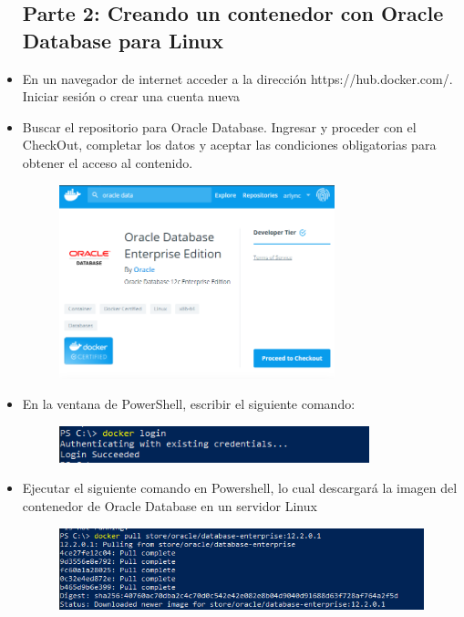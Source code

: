 \begin{itemize}
\subsection{Parte 2: Creando un contenedor con Oracle Database para Linux}
	\item En un navegador de internet acceder a la dirección https://hub.docker.com/. Iniciar sesión o crear una cuenta nueva
	\item Buscar el repositorio para Oracle Database. Ingresar y proceder con el CheckOut, completar los datos y aceptar las condiciones obligatorias para obtener el acceso al contenido.
		\begin{figure}[H]
		\begin{center}
		\includegraphics[width=8cm]{./Imagenes/3}
		\end{center}
		\end{figure}
	\item En la ventana de PowerShell, escribir el siguiente comando:
		\begin{figure}[H]
		\begin{center}
		\includegraphics[width=9cm]{./Imagenes/4}
		\end{center}
		\end{figure}
	\item Ejecutar el siguiente comando en Powershell, lo cual descargará la imagen del contenedor de Oracle Database en un servidor Linux
		\begin{figure}[H]
		\begin{center}
		\includegraphics[width=15cm]{./Imagenes/5}

\end{center}
\end{figure}
\end{itemize}
